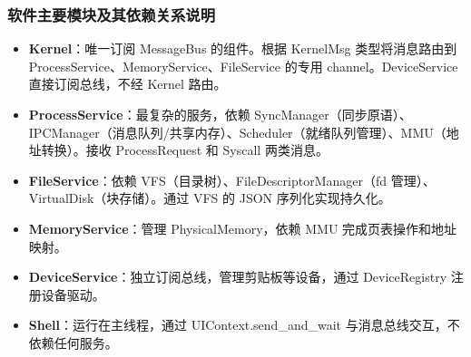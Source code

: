 \documentclass[UTF8,a4paper,12pt]{ctexart}
\begin{document}
\begin{center}
\end{center}

\subsubsection{软件主要模块及其依赖关系说明}

\begin{itemize}
    \item \textbf{Kernel}：唯一订阅 MessageBus 的组件。根据 KernelMsg 类型将消息路由到 ProcessService、MemoryService、FileService 的专用 channel。DeviceService 直接订阅总线，不经 Kernel 路由。
    \item \textbf{ProcessService}：最复杂的服务，依赖 SyncManager（同步原语）、IPCManager（消息队列/共享内存）、Scheduler（就绪队列管理）、MMU（地址转换）。接收 ProcessRequest 和 Syscall 两类消息。
    \item \textbf{FileService}：依赖 VFS（目录树）、FileDescriptorManager（fd 管理）、VirtualDisk（块存储）。通过 VFS 的 JSON 序列化实现持久化。
    \item \textbf{MemoryService}：管理 PhysicalMemory，依赖 MMU 完成页表操作和地址映射。
    \item \textbf{DeviceService}：独立订阅总线，管理剪贴板等设备，通过 DeviceRegistry 注册设备驱动。
    \item \textbf{Shell}：运行在主线程，通过 UIContext.send\_and\_wait 与消息总线交互，不依赖任何服务。
\end{itemize}
\end{document}
